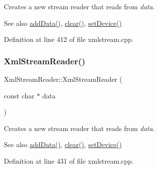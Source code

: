 Creates a new stream reader that reads from {\itshape data}.

\begin{DoxySeeAlso}{See also}
\hyperlink{class_xml_stream_reader_add6baa0f8790fc528c1fa6e05755f96b}{add\+Data()}, \hyperlink{class_xml_stream_reader_a2a67f5a1fff83d33214ccc9ec9494ca0}{clear()}, \hyperlink{class_xml_stream_reader_a0d166c5c7814d44a0015a82f0500cee5}{set\+Device()} 
\end{DoxySeeAlso}


Definition at line 412 of file xmlstream.\+cpp.

\mbox{\label{class_xml_stream_reader_ab8374c8328df1023e4274b780caefea3}} 
\subsubsection{\texorpdfstring{Xml\+Stream\+Reader()}{XmlStreamReader()}\hspace{0.1cm}{\footnotesize\ttfamily [5/5]}}
{\footnotesize\ttfamily Xml\+Stream\+Reader\+::\+Xml\+Stream\+Reader (\begin{DoxyParamCaption}\item[{const char $\ast$}]{data }\end{DoxyParamCaption})\hspace{0.3cm}{\ttfamily [explicit]}}

Creates a new stream reader that reads from {\itshape data}.

\begin{DoxySeeAlso}{See also}
\hyperlink{class_xml_stream_reader_add6baa0f8790fc528c1fa6e05755f96b}{add\+Data()}, \hyperlink{class_xml_stream_reader_a2a67f5a1fff83d33214ccc9ec9494ca0}{clear()}, \hyperlink{class_xml_stream_reader_a0d166c5c7814d44a0015a82f0500cee5}{set\+Device()} 
\end{DoxySeeAlso}


Definition at line 431 of file xmlstream.\+cpp.

\mbox{\label{class_xml_stream_reader_ae1ee1ea88f07303fa7a25d9c800d646a}} 
